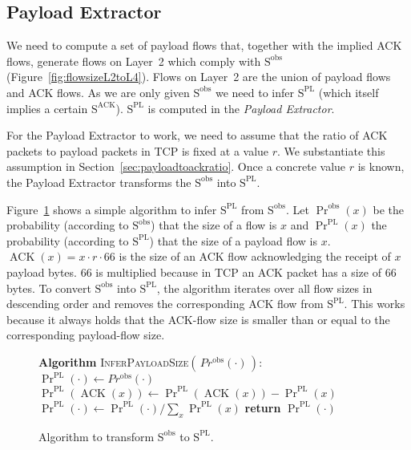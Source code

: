 \documentclass[journal,10pt]{IEEEtran}
\DeclareMathOperator{\ACK}{ACK}
\newcommand{\lt}{Layer~2}
\newcommand{\size}[1]{\ensuremath{\mathrm{S}  ^{\mathrm{#1}}}}
\begin{document}
\subsection{Payload Extractor}
We need to compute a set of payload flows that, together with the implied ACK flows, generate flows on \lt{} which comply with \size{obs}
(Figure~\ref{fig:flowsizeL2toL4}). 
Flows on \lt{} are the union of payload flows and ACK flows.
As we are only given \size{obs} we need to infer \size{PL}
(which itself implies a certain \size{ACK}).
\size{PL} is computed in the \emph{Payload Extractor}.

For the Payload Extractor to work, we need to
assume that the ratio of ACK packets to payload packets in TCP is fixed at a value $r$. 
We substantiate this assumption in Section~\ref{sec:payloadtoackratio}.
Once a concrete value $r$ is known, the Payload Extractor transforms the \size{obs} into \size{PL}.

Figure~\ref{algo:flowsizetoPL} shows a simple algorithm to infer \size{PL} from \size{obs}.
Let $\Pr^{\mathrm{obs}}(x)$ be the probability (according to \size{obs}) that the size of a flow is $x$
and $\Pr^{\mathrm{PL}}(x)$ the probability (according to \size{PL}) that the size of a payload flow is $x$.
$\ACK\left(x\right) = x \cdot r \cdot 66$ is the size of an ACK flow acknowledging
the receipt of $x$ payload bytes. $66$ is multiplied because in TCP an ACK packet has a size of 66 bytes.
To convert \size{obs} into \size{PL},
the algorithm iterates over all flow sizes in descending order
and removes the corresponding ACK flow from \size{PL}.
This works because it always holds that the ACK-flow size is smaller than or equal to the corresponding payload-flow size.

\begin{figure}
\begin{algorithmic}[1]
	\State \textbf{Algorithm} \textsc{InferPayloadSize}$\left(\,Pr^{\mathrm{obs}}(\cdot)\,\right)$:
	\State $\Pr^{\mathrm{PL}}(\cdot) \gets Pr^{\mathrm{obs}}(\cdot)$
		\State $\Pr^{\mathrm{PL}}\left(\ACK\left(x\right)\right) \gets \Pr^{\mathrm{PL}}\left(\ACK\left(x\right)\right) - \Pr^{\mathrm{PL}}\left(x\right)$
	\EndFor
	\State $\Pr^{\mathrm{PL}}(\cdot) \gets \Pr^{\mathrm{PL}}(\cdot) / \sum_{x} \Pr^{\mathrm{PL}}(x)$ 
	\State \textbf{return} $\Pr^{\mathrm{PL}}(\cdot)$
\end{algorithmic}
	\caption{Algorithm to transform \size{obs} to \size{PL}.}
	\label{algo:flowsizetoPL}
\end{figure}
\end{document}

